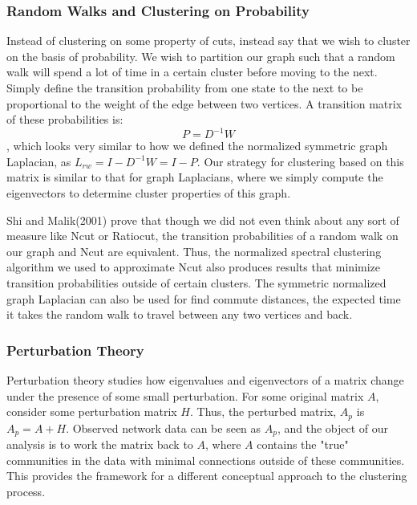 \documentclass{article}
\begin{document}
\subsubsection{Random Walks and Clustering on Probability}

Instead of clustering on some property of cuts, instead say that we wish to cluster on the basis of probability. We wish to partition our graph such that a random walk will spend a lot of time in a certain cluster before moving to the next. Simply define the transition probability from one state to the next to be proportional to the weight of the edge between two vertices. A transition matrix of these probabilities is: $$P = D^{-1}W$$, which looks very similar to how we defined the normalized symmetric graph Laplacian, as $L_{rw} = I - D^{-1}W = I -P$. Our strategy for clustering based on this matrix is similar to that for graph Laplacians, where we simply compute the eigenvectors to determine cluster properties of this graph. 

Shi and Malik(2001) prove that though we did not even think about any sort of measure like Ncut or Ratiocut, the transition probabilities of a random walk on our graph and Ncut are equivalent. Thus, the normalized spectral clustering algorithm we used to approximate Ncut also produces results that minimize transition probabilities outside of certain clusters. The symmetric normalized graph Laplacian can also be used for find commute distances, the expected time it takes the random walk to travel between any two vertices and back.

\subsubsection{Perturbation Theory}

Perturbation theory studies how eigenvalues and eigenvectors of a matrix change under the presence of some small perturbation. For some original matrix $A$, consider some perturbation matrix $H$. Thus, the perturbed matrix, $A_p$ is $A_p = A + H$.  Observed network data can be seen as $A_p$, and the object of our analysis is to work the matrix back to $A$, where $A$ contains the "true" communities in the data with minimal connections outside of these communities. This provides the framework for a different conceptual approach to the clustering process.


            
\end{document}
